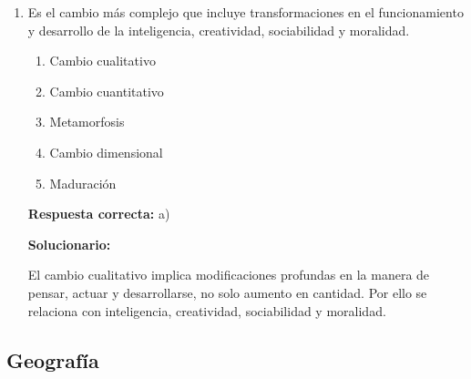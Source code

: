 \begin{enumerate}[resume]
	\vspace{2mm}
	\textbf{Solucionario:}
	
	La epistemología estudia la naturaleza, origen y validez del conocimiento científico.
	
	\vspace{6mm}
	
	\item Es el cambio más complejo que incluye transformaciones en el funcionamiento y desarrollo de la inteligencia, creatividad, sociabilidad y moralidad.
	\begin{enumerate}[label=\alph*)]
		\item Cambio cualitativo
		\item Cambio cuantitativo
		\item Metamorfosis
		\item Cambio dimensional
		\item Maduración
	\end{enumerate}
	\textbf{Respuesta correcta:} a)
	
	\vspace{2mm}
	\textbf{Solucionario:}
	
	El cambio cualitativo implica modificaciones profundas en la manera de pensar, actuar y desarrollarse, no solo aumento en cantidad. Por ello se relaciona con inteligencia, creatividad, sociabilidad y moralidad.
	
	\vspace{6mm}
	
\end{enumerate}

\subsection*{Geografía}

